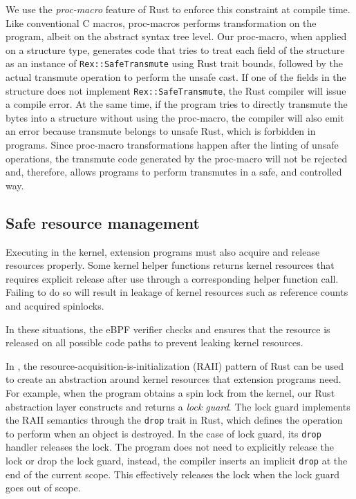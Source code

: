 We use the \emph{proc-macro} feature of Rust to enforce this constraint at
    compile time.
Like conventional C macros, proc-macros performs transformation on the program,
    albeit on the abstract syntax tree level.
Our proc-macro, when applied on a structure type, generates code that tries
    to treat each field of the structure as an instance of
    \texttt{Rex::SafeTransmute} using Rust trait bounds, followed by the actual
    transmute operation to perform the unsafe cast.
If one of the fields in the structure does not implement
    \texttt{Rex::SafeTransmute}, the Rust compiler will issue a compile error.
At the same time, if the program tries to directly transmute the bytes into a
    structure without using the proc-macro, the compiler will also emit an
    error because transmute belongs to unsafe Rust, which is forbidden in
    \projname{} programs.
Since proc-macro transformations happen after the linting of unsafe operations,
    the transmute code generated by the proc-macro will not be rejected and,
    therefore, allows programs to perform transmutes in a safe, and controlled
    way.

\subsection{Safe resource management}
Executing in the kernel, extension programs must also acquire and release
    resources properly.
Some kernel helper functions returns kernel resources that requires
    explicit release after use through a corresponding helper function call.
Failing to do so will result in leakage of kernel resources such as reference
    counts and acquired spinlocks.

In these situations, the eBPF verifier checks and ensures that the resource is
    released on all possible code paths to prevent leaking kernel resources.

In \projname{}, the resource-acquisition-is-initialization (RAII) pattern of
    Rust can be used to create an abstraction around kernel resources that
    extension programs need.
For example, when the program obtains a spin lock from the kernel, our Rust
    abstraction layer constructs and returns a \emph{lock guard}.
The lock guard implements the RAII semantics through the \texttt{drop} trait in
    Rust, which defines the operation to perform when an object is destroyed.
In the case of lock guard, its \texttt{drop} handler releases the lock.
The program does not need to explicitly release the lock or drop the lock
    guard, instead, the compiler inserts an implicit \texttt{drop} at the end
    of the current scope. This effectively releases the lock when the lock
    guard goes out of scope.

